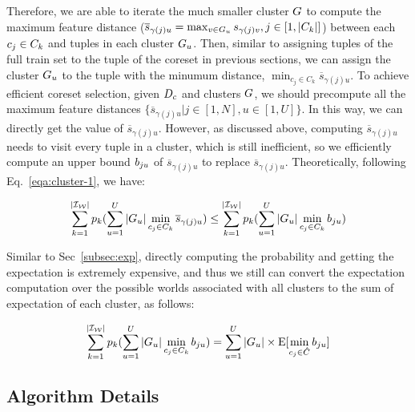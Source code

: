 Therefore,  we are able to iterate the much smaller cluster $G$ to compute  the maximum feature distance (\ie $\overline{s}_{\gamma(j)u} = \max_{v \in G_u}s_{\gamma(j)v}, j \in [1,|C_k|]$) between each $c_j \in C_k$ and tuples in each cluster $G_u$. Then, similar to assigning tuples of the full train set to the tuple of the coreset in previous sections, we can assign the cluster $G_u$ to the tuple  with the minumum distance, \ie $\min_{c_j\in C_k} \overline{s}_{\gamma(j)u}$. To achieve efficient coreset selection, given $D_c$ and clusters $G$, we should precompute all the maximum feature distances $\{\overline{s}_{\gamma(j)u}|j \in [1,N], u \in [1,U]\}$. In this way, we can directly get the value of $\overline{s}_{\gamma(j)u}$. However, as discussed above, computing $\overline{s}_{\gamma(j)u}$ needs to visit every tuple in a cluster, which is still inefficient, so we  efficiently compute an upper bound $b_{ju}$ of  $\overline{s}_{\gamma(j)u}$ to replace $\overline{s}_{\gamma(j)u}$. Theoretically, following Eq.~\ref{eqa:cluster-1}, we have:

\begin{equation}\label{eqa:cluster-3}
    \begin{aligned}
        \sum_{k= 1}^{|\mathcal{I_W}|} p_k (\sum_{u=1}^U |G_u| \min_{c_j\in C_k} \overline{s}_{\gamma(j)u}) \leq \sum_{k= 1}^{|\mathcal{I_W}|} p_k (\sum_{u=1}^U |G_u| \min_{c_j\in C_k} b_{ju})
    \end{aligned}
\end{equation}

Similar to Sec~\ref{subsec:exp}, directly computing the probability and getting the expectation is extremely expensive, and thus we still can convert the expectation computation over the possible worlds associated with all clusters to the sum of expectation of each cluster, as follows:

\begin{equation}\label{eqa:cluster-4}
    \begin{aligned}
        \sum_{k= 1}^{|\mathcal{I_W}|} p_k (\sum_{u=1}^U |G_u| \min_{c_j\in C_k} b_{ju}) = \sum_{u=1}^U  |G_u| \times\mathrm{E}[\min_{c_j\in \hat{C}}b_{ju}]
    \end{aligned}
\end{equation}

\subsection{Algorithm Details}


